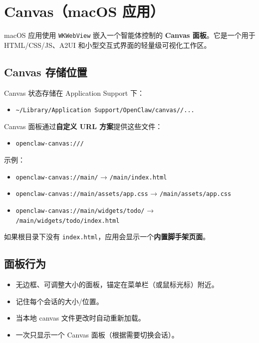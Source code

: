 \clearpage

\section{Canvas（macOS 应用）}


macOS 应用使用 \texttt{WKWebView} 嵌入一个智能体控制的 \textbf{Canvas 面板}。它是一个用于 HTML/CSS/JS、A2UI 和小型交互式界面的轻量级可视化工作区。

\subsection{Canvas 存储位置}


Canvas 状态存储在 Application Support 下：

\begin{itemize}
  \item \texttt{\textasciitilde{}/Library/Application Support/OpenClaw/canvas//...}
\end{itemize}


Canvas 面板通过\textbf{自定义 URL 方案}提供这些文件：

\begin{itemize}
  \item \texttt{openclaw-canvas:///}
\end{itemize}


示例：

\begin{itemize}
  \item \texttt{openclaw-canvas://main/} → \texttt{/main/index.html}
  \item \texttt{openclaw-canvas://main/assets/app.css} → \texttt{/main/assets/app.css}
  \item \texttt{openclaw-canvas://main/widgets/todo/} → \texttt{/main/widgets/todo/index.html}
\end{itemize}


如果根目录下没有 \texttt{index.html}，应用会显示一个\textbf{内置脚手架页面}。

\subsection{面板行为}


\begin{itemize}
  \item 无边框、可调整大小的面板，锚定在菜单栏（或鼠标光标）附近。
  \item 记住每个会话的大小/位置。
  \item 当本地 canvas 文件更改时自动重新加载。
  \item 一次只显示一个 Canvas 面板（根据需要切换会话）。
\end{itemize}


